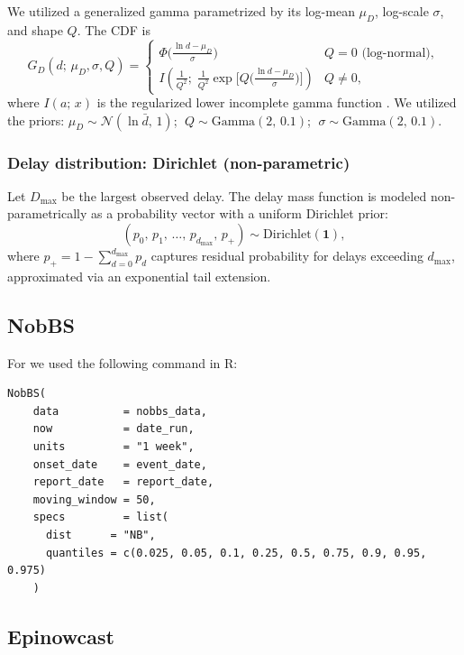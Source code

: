 \documentclass{article}
\begin{document}
We utilized a generalized gamma parametrized by its log-mean $\mu_D$,
log-scale $\sigma$, and shape $Q$.  The CDF is
\begin{equation}
  G_D(d;\,\mu_D,\sigma,Q) =
  \begin{cases}
    \Phi\!\bigl(\tfrac{\ln d - \mu_D}{\sigma}\bigr) & Q = 0\text{ (log-normal)}, \\[4pt]
    I\!\left(\tfrac{1}{Q^2};\;
      \tfrac{1}{Q^2}\exp\!\bigl[Q\bigl(\tfrac{\ln d - \mu_D}{\sigma}\bigr)\bigr]
    \right) & Q \neq 0,
  \end{cases}
\end{equation}
where $I(a;\,x)$ is the regularized lower incomplete gamma function \cite{prentice1974log}.
We utilized the priors:
$\mu_D \sim \mathcal{N}(\ln\bar{d},\, 1)$; $\;Q \sim \mathrm{Gamma}(2,\,0.1)$;
$\;\sigma \sim \mathrm{Gamma}(2,\,0.1)$.

\subsubsection*{Delay distribution: Dirichlet (non-parametric)}

Let $D_{\max}$ be the largest observed delay.
The delay mass function is modeled non-parametrically as a probability vector with
a uniform Dirichlet prior:
\begin{equation}
  (p_0,\,p_1,\,\ldots,\,p_{d_{\max}},\,p_+) \sim \mathrm{Dirichlet}(\mathbf{1}),
\end{equation}
where $p_+ = 1 - \sum_{d=0}^{d_{\max}} p_d$ captures residual probability for
delays exceeding $d_{\max}$, approximated via an exponential tail extension.


\subsection{NobBS}

For \cite{nobbs} we used the following command in R:

\begin{lstlisting}
NobBS(
    data          = nobbs_data,
    now           = date_run,
    units         = "1 week",
    onset_date    = event_date,
    report_date   = report_date,
    moving_window = 50, 
    specs         = list(
      dist      = "NB",
      quantiles = c(0.025, 0.05, 0.1, 0.25, 0.5, 0.75, 0.9, 0.95, 0.975)
    )
\end{lstlisting}

\subsection{Epinowcast}
\end{document}
